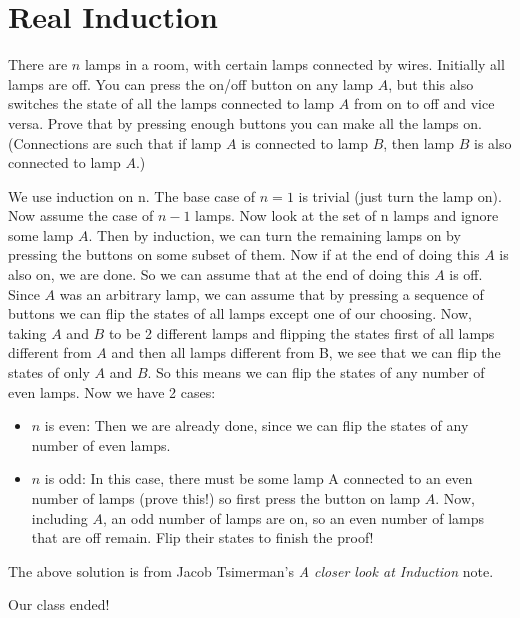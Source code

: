 \section{Real Induction}
\begin{example}
There are \(n\) lamps in a room, with certain lamps connected by wires. Initially
all lamps are off. You can press the on/off button on any lamp \(A\), but this also switches
the state of all the lamps connected to lamp \(A\) from on to off and vice versa. Prove that
by pressing enough buttons you can make all the lamps on. (Connections are such that if
lamp \(A\) is connected to lamp \(B\), then lamp \(B\) is also connected to lamp \(A\).)
\end{example}

\begin{soln}
We use induction on n. The base case of \(n = 1\) is trivial (just turn the lamp on).
Now assume the case of \(n - 1\) lamps. Now look at the set of n lamps and ignore some
lamp \(A\). Then by induction, we can turn the remaining lamps on by pressing the buttons
on some subset of them. Now if at the end of doing this \(A\) is also on, we are done. So we
can assume that at the end of doing this \(A\) is off. Since \(A\) was an arbitrary lamp, we can
assume that by pressing a sequence of buttons we can flip the states of all lamps except
one of our choosing. Now, taking \(A\) and \(B\) to be 2 different lamps and flipping the states
first of all lamps different from \(A\) and then all lamps different from B, we see that we can
flip the states of only \(A\) and \(B\). So this means we can flip the states of any number of even
lamps. Now we have 2 cases:
\begin{itemize}
	\item \(n\) is even: Then we are already done, since we can flip the states of any number of
even lamps.
	\item \(n\) is odd: In this case, there must be some lamp A connected to an even number of
lamps (prove this!) so first press the button on lamp \(A\). Now, including \(A\), an odd
number of lamps are on, so an even number of lamps that are off remain. Flip their
states to finish the proof!
\end{itemize}

\end{soln}
The above solution is from Jacob Tsimerman's \textit{A closer look at Induction} note.

Our class ended!


